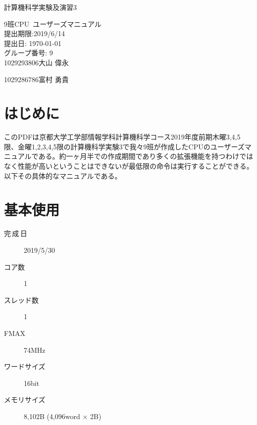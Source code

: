 \documentclass[a4paper,11pt,oneside,openany]{jsarticle}
\begin{document}
\begin{center}

  \vspace*{35mm}
  \huge 計算機科学実験及演習3 \par
  9班CPU\ ユーザーズマニュアル\\
  \vspace{90mm}
  \Large 提出期限:2019/6/14\\
   提出日: \today \\
  \vspace{15mm}
  \Large グループ番号: 9    \\
   1029293806\hspace{5mm}大山 偉永\par
   1029286786\hspace{5mm}富村 勇貴\par

  \vspace{10mm}
\end{center}
\clearpage
\addtocounter{page}{-1}

\newpage

\section{はじめに}
このPDFは京都大学工学部情報学科計算機科学コース2019年度前期木曜3,4,5限、金曜1,2,3,4,5限の計算機科学実験3で我々9班が作成したCPUのユーザーズマニュアルである。約一ヶ月半での作成期間であり多くの拡張機能を持つわけではなく性能が高いということはできないが最低限の命令は実行することができる。以下その具体的なマニュアルである。

\section{基本使用}
\begin{description}
  \item[完\,成\,日] 2019/5/30
  \item[コア数] 1
  \item[スレッド数] 1
  \item[FMAX] 74MHz
  \item[ワードサイズ] 16bit
  \item[メモリサイズ] 8,102B (4,096word $\times$ 2B)
\end{description}
\end{document}
